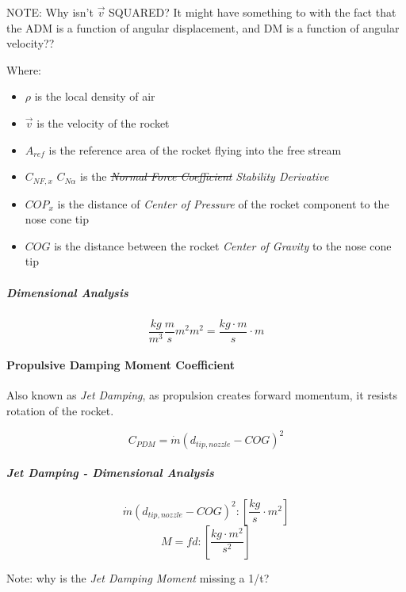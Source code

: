 \documentclass[]{article}
\providecommand{\tightlist}{%
  \setlength{\itemsep}{0pt}\setlength{\parskip}{0pt}}
\let\oldparagraph\paragraph
\renewcommand{\paragraph}[1]{\oldparagraph{#1}\mbox{}}
\let\oldsubparagraph\subparagraph
\renewcommand{\subparagraph}[1]{\oldsubparagraph{#1}\mbox{}}
\begin{document}
NOTE: Why isn't \(\vec{v}\) SQUARED? It might have something to with the
fact that the ADM is a function of angular displacement, and DM is a
function of angular velocity??

Where:

\begin{itemize}
\tightlist
\item
  \(\rho\) is the local density of air
\item
  \(\vec{v}\) is the velocity of the rocket
\item
  \(A_{ref}\) is the reference area of the rocket flying into the free
  stream
\item
  \sout{\(C_{NF,x}\)} \(C_{N \alpha}\) is the \sout{\emph{Normal Force
  Coefficient}} \emph{Stability Derivative}
\item
  \(COP_{x}\) is the distance of \emph{Center of Pressure} of the rocket
  component to the nose cone tip
\item
  \(COG\) is the distance between the rocket \emph{Center of Gravity} to
  the nose cone tip
\end{itemize}

\subparagraph{Dimensional Analysis}\label{dimensional-analysis-1}

\begin{equation}
\label{eq_c2a_dim_anal}
\dfrac{kg}{m^3} \dfrac{m}{s} m^2 m^2 = \dfrac{kg \cdot m }{s} \cdot m 
\end{equation}

\paragraph{Propulsive Damping Moment
Coefficient}\label{propulsive-damping-moment-coefficient}

Also known as \emph{Jet Damping}, as propulsion creates forward
momentum, it resists rotation of the rocket.

\begin{equation}
\label{eq_coef_moment_damping_jet}
C_{PDM} = \dot{m} \left( d_{tip,nozzle} - COG \right) ^2
\end{equation}

\subparagraph{Jet Damping - Dimensional
Analysis}\label{jet-damping---dimensional-analysis}

\[
\dot{m} \left( d_{tip,nozzle} - COG \right) ^2 :
\left[ \dfrac{kg}{s} \cdot m^2 \right]
\] \[
M = fd : 
\left[ \dfrac{kg \cdot m^2}{s^2} \right]
\]

Note: why is the \emph{Jet Damping Moment} missing a 1/t?
\end{document}
